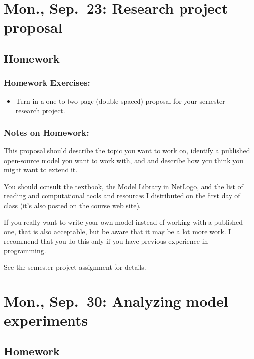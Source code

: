 \documentclass[
]{article}
\providecommand{\tightlist}{%
  \setlength{\itemsep}{0pt}\setlength{\parskip}{0pt}}
\begin{document}
\section{Mon., Sep.~23: Research project
proposal}\label{mon.-sep.-23-research-project-proposal}

\subsection{Homework}\label{homework-6}

\subsubsection{Homework Exercises:}\label{homework-exercises-6}

\begin{itemize}
\tightlist
\item
  Turn in a one-to-two page (double-spaced) proposal for your semester
  research project.
\end{itemize}

\subsubsection{Notes on Homework:}\label{notes-on-homework-4}

This proposal should describe the topic you want to work on, identify a
published open-source model you want to work with, and and describe how
you think you might want to extend it.

You should consult the textbook, the Model Library in NetLogo, and the
list of reading and computational tools and resources I distributed on
the first day of class (it's also posted on the course web site).

If you really want to write your own model instead of working with a
published one, that is also acceptable, but be aware that it may be a
lot more work. I recommend that you do this only if you have previous
experience in programming.

See the semester project assignment for details.

\section{Mon., Sep.~30: Analyzing model
experiments}\label{mon.-sep.-30-analyzing-model-experiments}

\subsection{Homework}\label{homework-7}
\end{document}
